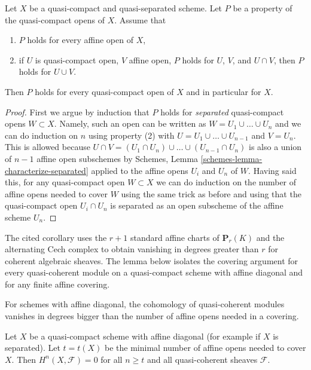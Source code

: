 \begin{lemma}
\label{lemma-induction-principle}
\begin{reference}
\cite[Proposition 3.3.1]{BvdB}
\end{reference}
Let $X$ be a quasi-compact and quasi-separated scheme. Let $P$ be a property
of the quasi-compact opens of $X$. Assume that
\begin{enumerate}
\item $P$ holds for every affine open of $X$,
\item if $U$ is quasi-compact open, $V$ affine open,
$P$ holds for $U$, $V$, and $U \cap V$, then
$P$ holds for $U \cup V$.
\end{enumerate}
Then $P$ holds for every quasi-compact open of $X$
and in particular for $X$.
\end{lemma}

\begin{proof}
First we argue by induction that $P$ holds for {\it separated} quasi-compact
opens $W \subset X$. Namely, such an open can be written as
$W = U_1 \cup \ldots \cup U_n$ and we can do induction on $n$ using
property (2) with $U = U_1 \cup \ldots \cup U_{n - 1}$ and $V = U_n$.
This is allowed because
$U \cap V = (U_1 \cap U_n) \cup \ldots \cup (U_{n - 1} \cap U_n)$
is also a union of $n - 1$ affine open subschemes by
Schemes, Lemma \ref{schemes-lemma-characterize-separated}
applied to the affine opens $U_i$ and $U_n$ of $W$.
Having said this, for any quasi-compact open $W \subset X$ we can
do induction on the number of affine opens needed to cover $W$
using the same trick as before and using that the quasi-compact open
$U_i \cap U_n$ is separated as an open subscheme of the affine scheme $U_n$.
\end{proof}

\begin{lemma}
\label{lemma-vanishing-nr-affines}
\begin{reference}
\cite[Chapter III, \S 1, no. 52, Proposition 2 and Corollary,
p. 244]{FAC}
\end{reference}
\begin{history}
The cited corollary uses the $r + 1$ standard affine charts of
$\mathbf{P}_r(K)$ and the alternating Cech complex to obtain vanishing in
degrees greater than $r$ for coherent algebraic sheaves. The lemma below
isolates the covering argument for every quasi-coherent module on a
quasi-compact scheme with affine diagonal and for any finite affine covering.
\end{history}
\begin{slogan}
For schemes with affine diagonal, the cohomology of quasi-coherent
modules vanishes in degrees bigger than the number of affine
opens needed in a covering.
\end{slogan}
Let $X$ be a quasi-compact scheme with affine diagonal (for example
if $X$ is separated).
Let $t = t(X)$ be the minimal number of affine opens needed to
cover $X$. Then $H^n(X, \mathcal{F}) = 0$ for all $n \geq t$ and all
quasi-coherent sheaves $\mathcal{F}$.
\end{lemma}

